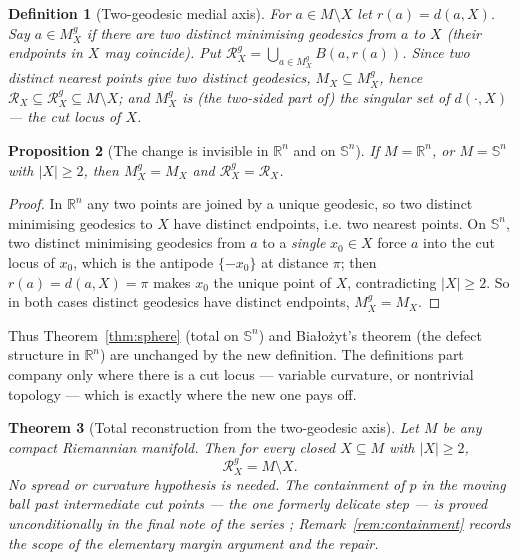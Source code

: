 \documentclass[11pt]{article}
\newtheorem{theorem}{Theorem}[section]
\newtheorem{proposition}[theorem]{Proposition}
\newtheorem{definition}[theorem]{Definition}
\theoremstyle{remark}
\newcommand{\R}{\mathbb{R}}
\newcommand{\X}{X}
\newcommand{\Mx}{M_{\X}}
\newcommand{\Rx}{\mathcal{R}_{\X}}
\newcommand{\Sn}{\mathbb{S}^{n}}
\begin{document}
\begin{definition}[Two-geodesic medial axis]\label{def:twogeo}
For $a\in M\setminus\X$ let $r(a)=d(a,\X)$. Say $a\in\Mx^{g}$ if there are
two distinct minimising geodesics from $a$ to $\X$ (their endpoints in
$\X$ may coincide). Put $\Rx^{g}=\bigcup_{a\in\Mx^{g}}B(a,r(a))$. Since two
distinct nearest points give two distinct geodesics, $\Mx\subseteq\Mx^{g}$,
hence $\Rx\subseteq\Rx^{g}\subseteq M\setminus\X$; and $\Mx^{g}$ is (the
two-sided part of) the singular set of $d(\cdot,\X)$ --- the cut locus of
$\X$.
\end{definition}

\begin{proposition}[The change is invisible in $\R^{n}$ and on $\Sn$]
\label{prop:invisible}
If $M=\R^{n}$, or $M=\Sn$ with $|\X|\ge2$, then $\Mx^{g}=\Mx$ and
$\Rx^{g}=\Rx$.
\end{proposition}

\begin{proof}
In $\R^{n}$ any two points are joined by a unique geodesic, so two
distinct minimising geodesics to $\X$ have distinct endpoints, i.e. two
nearest points. On $\Sn$, two distinct minimising geodesics from $a$ to a
\emph{single} $x_{0}\in\X$ force $a$ into the cut locus of $x_{0}$, which
is the antipode $\{-x_{0}\}$ at distance $\pi$; then $r(a)=d(a,\X)=\pi$
makes $x_{0}$ the unique point of $\X$, contradicting $|\X|\ge2$. So in
both cases distinct geodesics have distinct endpoints, $\Mx^{g}=\Mx$.
\end{proof}

Thus Theorem~\ref{thm:sphere} (total on $\Sn$) and Bia\l{}o\.zyt's theorem
(the defect structure in $\R^{n}$) are unchanged by the new definition.
The definitions part company only where there is a cut locus --- variable
curvature, or nontrivial topology --- which is exactly where the new one
pays off.

\begin{theorem}[Total reconstruction from the two-geodesic axis]
\label{thm:twogeo}
Let $M$ be \emph{any} compact Riemannian manifold. Then for every closed
$\X\subseteq M$ with $|\X|\ge2$,
\[
  \Rx^{g}=M\setminus\X .
\]
No spread or curvature hypothesis is needed. The containment of $p$ in
the moving ball past intermediate cut points --- the one formerly
delicate step --- is proved unconditionally in the final note of the
series \cite[Thm.~3.1, Cor.~3.2]{C}; Remark~\ref{rem:containment}
records the scope of the elementary margin argument and the repair.
\end{theorem}
\end{document}
